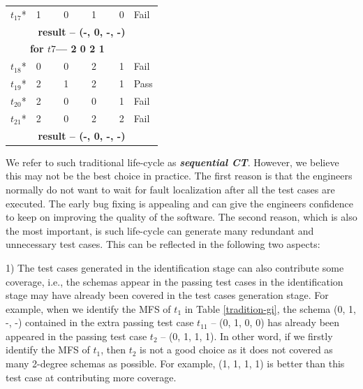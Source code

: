 \documentclass{sig-alternate}
\begin{document}
\begin{table}[h]
\begin{tabular}{llllll}
$t_{17}$* &\multicolumn{4}{l}{1  \ \ \ \  0 \ \ \ \  1  \ \ \ \ 0} & Fail \\
\multicolumn{6}{c}{\bfseries result --  (-, 0, -, -)}  \\
\multicolumn{5}{c}{\bfseries for $t7$--- 2 0 2 1} &  \\
$t_{18}$* &\multicolumn{4}{l}{0  \ \ \ \  0 \ \ \ \  2 \ \ \ \  1} & Fail \\
$t_{19}$* &\multicolumn{4}{l}{2  \ \ \ \  1 \ \ \ \  2 \ \ \ \  1} & Pass \\
$t_{20}$* &\multicolumn{4}{l}{2  \ \ \ \  0 \ \ \ \  0  \ \ \ \ 1} & Fail \\
$t_{21}$* &\multicolumn{4}{l}{2  \ \ \ \  0 \ \ \ \  2  \ \ \ \ 2} & Fail \\
\multicolumn{6}{c}{\bfseries result --  (-, 0, -, -)}  \\
\hline
\end{tabular}
\end{table}

We refer to such traditional life-cycle as \emph{\textbf{sequential CT}}. However, we believe this may not be the best choice in practice. The first reason is that the engineers normally do not want to wait for fault localization after all the test cases are executed. The early bug fixing is appealing and can give the engineers confidence to keep on improving the quality of the software. The second reason, which is also the most important, is such life-cycle can generate many redundant and unnecessary test cases. This can be reflected in the following two aspects:

1) The test cases generated in the identification stage can also contribute some coverage, i.e., the schemas appear in the passing test cases in the identification stage may have already been covered in the test cases generation stage.  For example, when we identify the MFS of $t_{1}$ in Table \ref{tradition-gi}, the schema (0, 1, -, -) contained in the extra passing test case $t_{11}$ -- (0, 1, 0, 0) has already been appeared in the passing test case $t_{2}$ -- (0, 1, 1, 1). In other word, if we firstly identify the MFS of $t_{1}$, then $t_{2}$ is not a good choice as it does not covered as many 2-degree schemas as possible. For example, (1, 1, 1, 1) is better than this test case at contributing more coverage.
\end{document}
